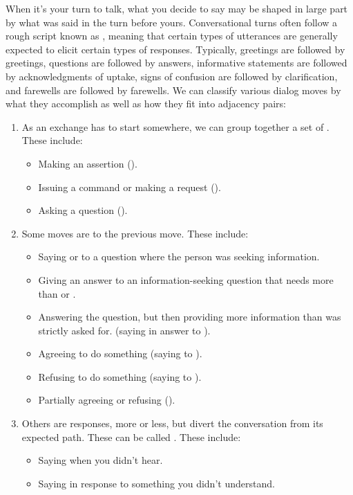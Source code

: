 When it's your turn to talk, what you decide to say may be shaped in large part by what was said in the turn before yours.  Conversational turns often follow a rough script known as , meaning that certain types of utterances are generally expected to elicit certain types of responses.  Typically, greetings are followed by greetings, questions are followed by answers, informative statements are followed by acknowledgments of uptake, signs of confusion are followed by clarification, and farewells are followed by farewells.  We can classify various dialog moves by what they accomplish as well as how they fit into adjacency pairs:

\begin{enumerate}
\item As 
an exchange has to start somewhere, we can group together a
set of . These include:
\begin{itemize}
\item Making an assertion  ().
\item Issuing a command or making a request ().
\item Asking a question ().
\end{itemize}
\item Some moves are  to the previous move.  These include:
\begin{itemize}
	\item Saying  or  to a question where the person was seeking information.
	\item Giving an answer to an information-seeking question that needs more than  or .
	\item Answering the question, but then providing more information than was strictly asked for. (saying  in answer to ). 
	\item Agreeing to do something (saying  to ).
	\item Refusing to do something (saying  to ).
	\item Partially agreeing or refusing ().

\end{itemize}
\item Others are responses, more or less, but divert the conversation from its expected path.  These can be called .
These include:
\begin{itemize}
	\item Saying  when you didn't hear.
	\item Saying  in response to something you didn't understand.
	

\end{itemize}
\end{enumerate}
